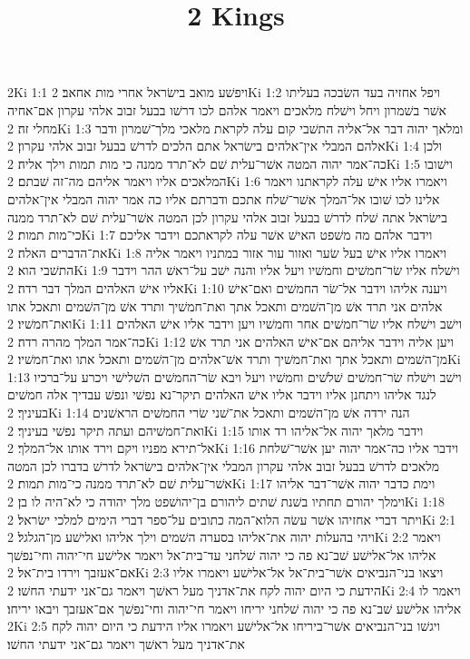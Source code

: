 

\title{2 Kings}

2Ki 1:1  ויפשׁע מואב בישׂראל אחרי מות אחאב׃
2Ki 1:2  ויפל אחזיה בעד השׂבכה בעליתו אשׁר בשׁמרון ויחל וישׁלח מלאכים ויאמר אלהם לכו דרשׁו בבעל זבוב אלהי עקרון אם־אחיה מחלי זה׃
2Ki 1:3  ומלאך יהוה דבר אל־אליה התשׁבי קום עלה לקראת מלאכי מלך־שׁמרון ודבר אלהם המבלי אין־אלהים בישׂראל אתם הלכים לדרשׁ בבעל זבוב אלהי עקרון׃
2Ki 1:4  ולכן כה־אמר יהוה המטה אשׁר־עלית שׁם לא־תרד ממנה כי מות תמות וילך אליה׃
2Ki 1:5  וישׁובו המלאכים אליו ויאמר אליהם מה־זה שׁבתם׃
2Ki 1:6  ויאמרו אליו אישׁ עלה לקראתנו ויאמר אלינו לכו שׁובו אל־המלך אשׁר־שׁלח אתכם ודברתם אליו כה אמר יהוה המבלי אין־אלהים בישׂראל אתה שׁלח לדרשׁ בבעל זבוב אלהי עקרון לכן המטה אשׁר־עלית שׁם לא־תרד ממנה כי־מות תמות׃
2Ki 1:7  וידבר אלהם מה משׁפט האישׁ אשׁר עלה לקראתכם וידבר אליכם את־הדברים האלה׃
2Ki 1:8  ויאמרו אליו אישׁ בעל שׂער ואזור עור אזור במתניו ויאמר אליה התשׁבי הוא׃
2Ki 1:9  וישׁלח אליו שׂר־חמשׁים וחמשׁיו ויעל אליו והנה ישׁב על־ראשׁ ההר וידבר אליו אישׁ האלהים המלך דבר רדה׃
2Ki 1:10  ויענה אליהו וידבר אל־שׂר החמשׁים ואם־אישׁ אלהים אני תרד אשׁ מן־השׁמים ותאכל אתך ואת־חמשׁיך ותרד אשׁ מן־השׁמים ותאכל אתו ואת־חמשׁיו׃
2Ki 1:11  וישׁב וישׁלח אליו שׂר־חמשׁים אחר וחמשׁיו ויען וידבר אליו אישׁ האלהים כה־אמר המלך מהרה רדה׃
2Ki 1:12  ויען אליה וידבר אליהם אם־אישׁ האלהים אני תרד אשׁ מן־השׁמים ותאכל אתך ואת־חמשׁיך ותרד אשׁ־אלהים מן־השׁמים ותאכל אתו ואת־חמשׁיו׃
2Ki 1:13  וישׁב וישׁלח שׂר־חמשׁים שׁלשׁים וחמשׁיו ויעל ויבא שׂר־החמשׁים השׁלישׁי ויכרע על־ברכיו לנגד אליהו ויתחנן אליו וידבר אליו אישׁ האלהים תיקר־נא נפשׁי ונפשׁ עבדיך אלה חמשׁים בעיניך׃
2Ki 1:14  הנה ירדה אשׁ מן־השׁמים ותאכל את־שׁני שׂרי החמשׁים הראשׁנים ואת־חמשׁיהם ועתה תיקר נפשׁי בעיניך׃
2Ki 1:15  וידבר מלאך יהוה אל־אליהו רד אותו אל־תירא מפניו ויקם וירד אותו אל־המלך׃
2Ki 1:16  וידבר אליו כה־אמר יהוה יען אשׁר־שׁלחת מלאכים לדרשׁ בבעל זבוב אלהי עקרון המבלי אין־אלהים בישׂראל לדרשׁ בדברו לכן המטה אשׁר־עלית שׁם לא־תרד ממנה כי־מות תמות׃
2Ki 1:17  וימת כדבר יהוה אשׁר־דבר אליהו וימלך יהורם תחתיו בשׁנת שׁתים ליהורם בן־יהושׁפט מלך יהודה כי לא־היה לו בן׃
2Ki 1:18  ויתר דברי אחזיהו אשׁר עשׂה הלוא־המה כתובים על־ספר דברי הימים למלכי ישׂראל׃
2Ki 2:1  ויהי בהעלות יהוה את־אליהו בסערה השׁמים וילך אליהו ואלישׁע מן־הגלגל׃
2Ki 2:2  ויאמר אליהו אל־אלישׁע שׁב־נא פה כי יהוה שׁלחני עד־בית־אל ויאמר אלישׁע חי־יהוה וחי־נפשׁך אם־אעזבך וירדו בית־אל׃
2Ki 2:3  ויצאו בני־הנביאים אשׁר־בית־אל אל־אלישׁע ויאמרו אליו הידעת כי היום יהוה לקח את־אדניך מעל ראשׁך ויאמר גם־אני ידעתי החשׁו׃
2Ki 2:4  ויאמר לו אליהו אלישׁע שׁב־נא פה כי יהוה שׁלחני יריחו ויאמר חי־יהוה וחי־נפשׁך אם־אעזבך ויבאו יריחו׃
2Ki 2:5  ויגשׁו בני־הנביאים אשׁר־ביריחו אל־אלישׁע ויאמרו אליו הידעת כי היום יהוה לקח את־אדניך מעל ראשׁך ויאמר גם־אני ידעתי החשׁו׃
